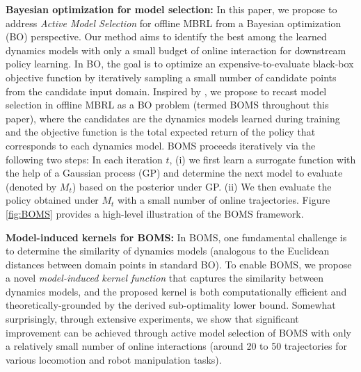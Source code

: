 \vspace{-1mm}
\noindent\textbf{Bayesian optimization for model selection:} In this paper, we propose to address \textit{Active Model Selection} for offline MBRL from a Bayesian optimization (BO) perspective. Our method aims to identify the best among the learned dynamics models with only a small budget of online interaction for downstream policy learning. In BO, the goal is to optimize an expensive-to-evaluate black-box objective function by iteratively sampling a small number of candidate points from the candidate input domain. Inspired by \citep{konyushova2021active}, we propose to recast model selection in offline MBRL as a BO problem (termed BOMS throughout this paper), where the candidates are the dynamics models learned during training and the objective function is the total expected return of the policy that corresponds to each dynamics model. BOMS proceeds iteratively via the following two steps: In each iteration $t$, (i) we first learn a surrogate function with the help of a Gaussian process (GP) and determine the next model to evaluate (denoted by $M_t$) based on the posterior under GP. (ii) We then evaluate the policy obtained under $M_t$ with a small number of online trajectories. 
Figure \ref{fig:BOMS} provides a high-level illustration of the BOMS framework.

\vspace{1mm}
\noindent\textbf{Model-induced kernels for BOMS:} In BOMS, one fundamental challenge is to determine the similarity of dynamics models (analogous to the Euclidean distances between domain points in standard BO). To enable BOMS, we propose a novel 
\textit{model-induced kernel function} that captures the similarity between dynamics models, and the proposed kernel is both computationally efficient and theoretically-grounded by the derived sub-optimality lower bound. 
Somewhat surprisingly, through extensive experiments, we show that significant improvement can be achieved through active model selection of BOMS with only a relatively small number of online interactions (\eg around 20 to 50 trajectories for various locomotion and robot manipulation tasks).

